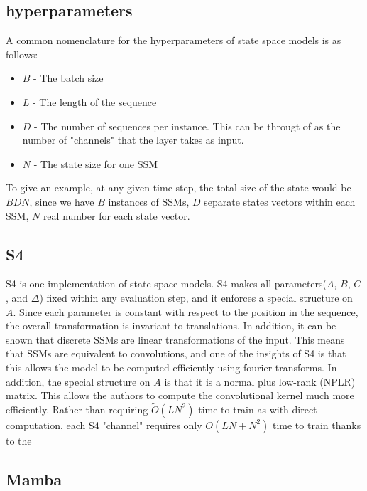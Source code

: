 \subsection{hyperparameters}
A common nomenclature for the hyperparameters of state space models is as
follows:
\begin{itemize}
    \item $B$ - The batch size
    \item $L$ - The length of the sequence
    \item $D$ - The number of sequences per instance. This can be througt of as
    the number of "channels" that the layer takes as input.
    \item $N$ - The state size for one SSM
\end{itemize}
To give an example, at any given time step, the total size of the state would be
$BDN$, since we have $B$ instances of SSMs, $D$ separate states vectors within
each SSM, $N$ real number for each state vector.

\subsection{S4}
S4\cite{gu2022efficiently} is one implementation of state space models.
S4 makes all parameters($A$, $B$, $C$, and $\Delta$) fixed within any evaluation
step, and it enforces a special structure on $A$.
Since each parameter is constant with respect to the position in the sequence,
the overall transformation is invariant to translations.
In addition, it can be shown that discrete SSMs are linear transformations of
the input.
This means that SSMs are equivalent to convolutions, and one of the insights of
S4 is that this allows the model to be computed efficiently using fourier
transforms.
In addition, the special structure on $A$ is that it is a normal plus low-rank
(NPLR) matrix. This allows the authors to compute the convolutional kernel much
more efficiently.
Rather than requiring $\tilde O(LN^2)$ time to train as with direct computation,
each S4 "channel" requires only $O(LN + N^2)$ time to train thanks to the
\subsection{Mamba}

